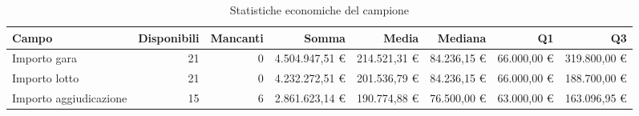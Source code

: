 \begin{table}[htbp]
\centering
\small
\caption{Statistiche economiche del campione}
\begin{tabular}{lrrrrrrr}
\toprule
Campo & Disponibili & Mancanti & Somma & Media & Mediana & Q1 & Q3 \\
\midrule
Importo gara & 21 & 0 & 4.504.947,51 € & 214.521,31 € & 84.236,15 € & 66.000,00 € & 319.800,00 € \\
Importo lotto & 21 & 0 & 4.232.272,51 € & 201.536,79 € & 84.236,15 € & 66.000,00 € & 188.700,00 € \\
Importo aggiudicazione & 15 & 6 & 2.861.623,14 € & 190.774,88 € & 76.500,00 € & 63.000,00 € & 163.096,95 € \\
\bottomrule
\end{tabular}
\end{table}
